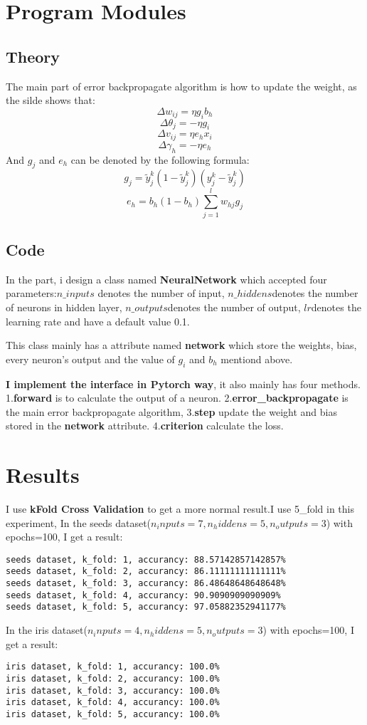 \documentclass{article}
\begin{document}
\section{Program Modules}

\subsection{Theory}
The main part of error backpropagate algorithm is how to update the weight, as the silde shows that:
$$\Delta w_{ij} = \eta g_i b_h$$
$$\Delta \theta_{j} = - \eta g_i$$
$$\Delta v_{ij} = \eta e_h x_i$$
$$\Delta \gamma_{h} = - \eta e_h$$
And $g_j$ and $e_h$ can be denoted by the following formula:
$$g_j = \tilde{y}_j^k(1-\tilde{y}_j^k)(y_j^k-\tilde{y}_j^k)$$
$$e_h = b_h(1-b_h)\sum_{j=1}^{l} {w_{hj} g_j}$$

\subsection{Code}
In the part, i design a class named \textbf{NeuralNetwork} which accepted four parameters:$n\_inputs$ denotes the number of
input, $n\_hiddens$denotes the number of neurons in hidden layer, $n\_outputs$denotes the number of output, 
$lr$denotes the learning rate and have a default value 0.1.

This class mainly has a attribute named \textbf{network} which store the weights, bias, every neuron's output and the value of $g_i$ and $b_h$ mentiond above.

\textbf{I implement the interface in Pytorch way}, it also mainly has four methods. 1.\textbf{forward} is to calculate the output of a neuron.
2.\textbf{error\_backpropagate} is the main error backpropagate algorithm, 3.\textbf{step} update the weight and bias stored in the \textbf{network}
attribute. 4.\textbf{criterion} calculate the loss.

\section{Results}
I use \textbf{kFold Cross Validation} to get a more normal result.I use 5\_fold in this experiment, In the seeds dataset($n_inputs=7, n_hiddens=5, n_outputs=3$) with epochs=100, 
I get a result:
\begin{commandline}
  \begin{verbatim}
seeds dataset, k_fold: 1, accurancy: 88.57142857142857%
seeds dataset, k_fold: 2, accurancy: 86.11111111111111%
seeds dataset, k_fold: 3, accurancy: 86.48648648648648%
seeds dataset, k_fold: 4, accurancy: 90.9090909090909%
seeds dataset, k_fold: 5, accurancy: 97.05882352941177%
	\end{verbatim}
\end{commandline}
In the iris dataset($n_inputs=4, n_hiddens=5, n_outputs=3$) with epochs=100, I get a result:
\begin{commandline}
  \begin{verbatim}
iris dataset, k_fold: 1, accurancy: 100.0%
iris dataset, k_fold: 2, accurancy: 100.0%
iris dataset, k_fold: 3, accurancy: 100.0%
iris dataset, k_fold: 4, accurancy: 100.0%
iris dataset, k_fold: 5, accurancy: 100.0%
	\end{verbatim}
\end{commandline}
\end{document}
